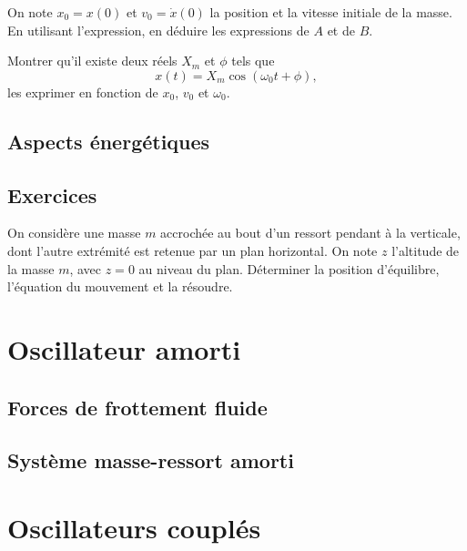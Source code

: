 \documentclass[../main]{subfiles}
\begin{document}
On note $x_0=x(0)$ et $v_0=\dot{x}(0)$ la position et la vitesse initiale de la masse. En utilisant l'expression, en déduire les expressions de $A$ et de $B$.


\begin{exo}
Montrer qu'il existe deux réels $X_m$ et $\phi$ tels que 
\[x(t)=X_m\cos(\omega_0t+\phi),\]
les exprimer en fonction de $x_0$, $v_0$ et $\omega_0$.
\end{exo}

\subsection{Aspects énergétiques}

\subsection{Exercices}

\begin{exo}
	On considère une masse $m$ accrochée au bout d'un ressort pendant à la verticale, dont l'autre extrémité est retenue par un plan horizontal. On note $z$ l'altitude de la masse $m$, avec $z=0$ au niveau du plan. Déterminer la position d'équilibre, l'équation du mouvement et la résoudre.
\end{exo}

\section{Oscillateur amorti}

\subsection{Forces de frottement fluide}

\subsection{Système masse-ressort amorti}

\section{Oscillateurs couplés}
\end{document}
